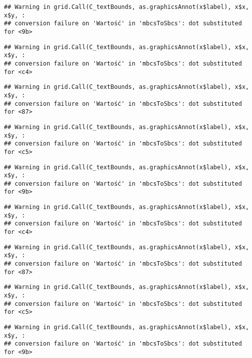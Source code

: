 \documentclass[
]{book}
\begin{document}
\begin{verbatim}
## Warning in grid.Call(C_textBounds, as.graphicsAnnot(x$label), x$x, x$y, :
## conversion failure on 'Wartość' in 'mbcsToSbcs': dot substituted for <9b>
\end{verbatim}

\begin{verbatim}
## Warning in grid.Call(C_textBounds, as.graphicsAnnot(x$label), x$x, x$y, :
## conversion failure on 'Wartość' in 'mbcsToSbcs': dot substituted for <c4>
\end{verbatim}

\begin{verbatim}
## Warning in grid.Call(C_textBounds, as.graphicsAnnot(x$label), x$x, x$y, :
## conversion failure on 'Wartość' in 'mbcsToSbcs': dot substituted for <87>
\end{verbatim}

\begin{verbatim}
## Warning in grid.Call(C_textBounds, as.graphicsAnnot(x$label), x$x, x$y, :
## conversion failure on 'Wartość' in 'mbcsToSbcs': dot substituted for <c5>
\end{verbatim}

\begin{verbatim}
## Warning in grid.Call(C_textBounds, as.graphicsAnnot(x$label), x$x, x$y, :
## conversion failure on 'Wartość' in 'mbcsToSbcs': dot substituted for <9b>
\end{verbatim}

\begin{verbatim}
## Warning in grid.Call(C_textBounds, as.graphicsAnnot(x$label), x$x, x$y, :
## conversion failure on 'Wartość' in 'mbcsToSbcs': dot substituted for <c4>
\end{verbatim}

\begin{verbatim}
## Warning in grid.Call(C_textBounds, as.graphicsAnnot(x$label), x$x, x$y, :
## conversion failure on 'Wartość' in 'mbcsToSbcs': dot substituted for <87>
\end{verbatim}

\begin{verbatim}
## Warning in grid.Call(C_textBounds, as.graphicsAnnot(x$label), x$x, x$y, :
## conversion failure on 'Wartość' in 'mbcsToSbcs': dot substituted for <c5>
\end{verbatim}

\begin{verbatim}
## Warning in grid.Call(C_textBounds, as.graphicsAnnot(x$label), x$x, x$y, :
## conversion failure on 'Wartość' in 'mbcsToSbcs': dot substituted for <9b>
\end{verbatim}
\end{document}
